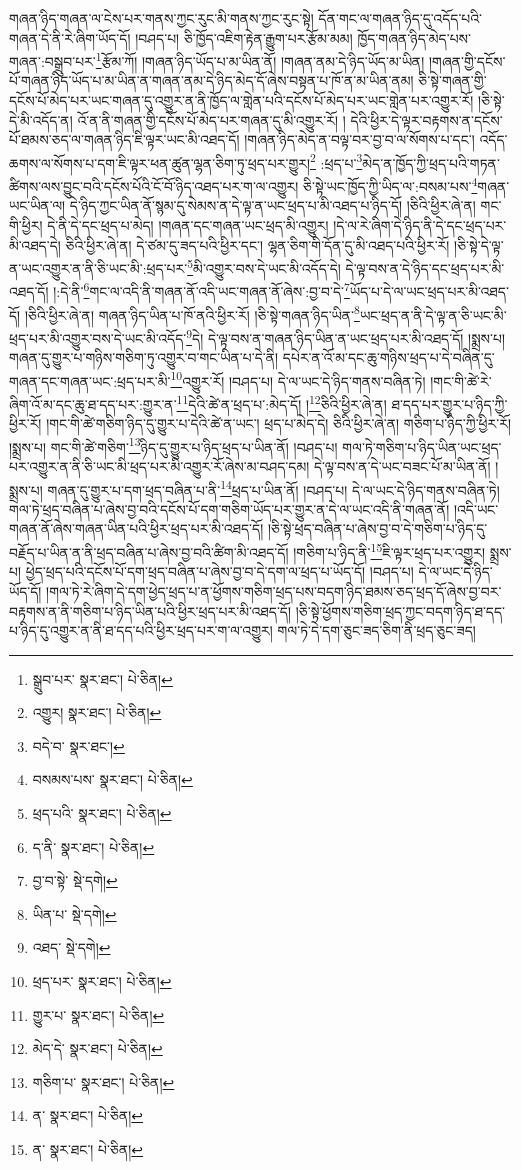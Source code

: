 གཞན་ཉིད་གཞན་ལ་ངེས་པར་གནས་ཀྱང་རུང་མི་གནས་ཀྱང་རུང་སྟེ། དོན་གང་ལ་གཞན་ཉིད་དུ་འདོད་པའི་གཞན་དེ་ནི་རེ་ཞིག་ཡོད་དོ། །བཤད་པ། ཅི་ཁྱོད་འཇིག་རྟེན་རྒྱུག་པར་རྩོམ་མམ། ཁྱོད་གཞན་ཉིད་མེད་པས་གཞན་:བསྒྲུབ་པར་\footnote{སྒྲུབ་པར་  སྣར་ཐང་།  པེ་ཅིན། }རྩོམ་ཀོ། །གཞན་ཉིད་ཡོད་པ་མ་ཡིན་ནོ། །གཞན་ནམ་དེ་ཉིད་ཡོད་མ་ཡིན། །གཞན་གྱི་དངོས་པོ་གཞན་ཉིད་ཡོད་པ་མ་ཡིན་ན་གཞན་ནམ་དེ་ཉིད་མེད་དོ་ཞེས་བསྟན་པ་ཁོ་ན་མ་ཡིན་ནམ། ཅི་སྟེ་གཞན་གྱི་དངོས་པོ་མེད་པར་ཡང་གཞན་དུ་འགྱུར་ན་ནི་ཁྱོད་ལ་གླེན་པའི་དངོས་པོ་མེད་པར་ཡང་གླེན་པར་འགྱུར་རོ། །ཅི་སྟེ་དེ་མི་འདོད་ན། འོ་ན་ནི་གཞན་གྱི་དངོས་པོ་མེད་པར་གཞན་དུ་མི་འགྱུར་རོ། །
དེའི་ཕྱིར་དེ་ལྟར་བརྟགས་ན་དངོས་པོ་ཐམས་ཅད་ལ་གཞན་ཉིད་ཇི་ལྟར་ཡང་མི་འཐད་དོ། །གཞན་ཉིད་མེད་ན་བལྟ་བར་བྱ་བ་ལ་སོགས་པ་དང་། འདོད་ཆགས་ལ་སོགས་པ་དག་ཇི་ལྟར་ཕན་ཚུན་ལྷན་ཅིག་ཏུ་ཕྲད་པར་གྱུར།\footnote{འགྱུར།  སྣར་ཐང་།  པེ་ཅིན། } :ཕྲད་པ་\footnote{བདེ་བ་  སྣར་ཐང་། }མེད་ན་ཁྱོད་ཀྱི་ཕྲད་པའི་གཏན་ཚིགས་ལས་བྱུང་བའི་དངོས་པོའི་ངོ་བོ་ཉིད་འཐད་པར་ག་ལ་འགྱུར། ཅི་སྟེ་ཡང་ཁྱོད་ཀྱི་ཡིད་ལ་:བསམ་པས་\footnote{བསམས་པས་  སྣར་ཐང་།  པེ་ཅིན། }གཞན་ཡང་ཡིན་ལ། དེ་ཉིད་ཀྱང་ཡིན་ནོ་སྙམ་དུ་སེམས་ན་དེ་ལྟ་ན་ཡང་ཕྲད་པ་མི་འཐད་པ་ཉིད་དོ། །ཅིའི་ཕྱིར་ཞེ་ན། གང་གི་ཕྱིར། དེ་ནི་དེ་དང་ཕྲད་པ་མེད། །གཞན་དང་གཞན་ཡང་ཕྲད་མི་འགྱུར། །དེ་ལ་རེ་ཞིག་དེ་ཉིད་ནི་དེ་དང་ཕྲད་པར་མི་འཐད་དེ། ཅིའི་ཕྱིར་ཞེ་ན། དེ་ཙམ་དུ་ཟད་པའི་ཕྱིར་དང་། ལྷན་ཅིག་གི་དོན་དུ་མི་འཐད་པའི་ཕྱིར་རོ། །ཅི་སྟེ་དེ་ལྟ་ན་ཡང་འགྱུར་ན་ནི་ཅི་ཡང་མི་:ཕྲད་པར་\footnote{ཕྲད་པའི་  སྣར་ཐང་།  པེ་ཅིན། }མི་འགྱུར་བས་དེ་ཡང་མི་འདོད་དེ། དེ་ལྟ་བས་ན་དེ་ཉིད་དང་ཕྲད་པར་མི་འཐད་དོ། །:དེ་ནི་\footnote{ད་ནི་  སྣར་ཐང་།  པེ་ཅིན། }གང་ལ་འདི་ནི་གཞན་ནོ་འདི་ཡང་གཞན་ནོ་ཞེས་:བྱ་བ་དེ་\footnote{བྱ་བ་སྟེ་  སྡེ་དགེ། }ཡོད་པ་དེ་ལ་ཡང་ཕྲད་པར་མི་འཐད་དོ། །ཅིའི་ཕྱིར་ཞེ་ན། གཞན་ཉིད་ཡིན་པ་ཁོ་ནའི་ཕྱིར་རོ། །ཅི་སྟེ་གཞན་ཉིད་ཡིན་\footnote{ཡིན་པ་  སྡེ་དགེ། }ཡང་ཕྲད་ན་ནི་དེ་ལྟ་ན་ཅི་ཡང་མི་ཕྲད་པར་མི་འགྱུར་བས་དེ་ཡང་མི་འདོད་\footnote{འཐད་  སྡེ་དགེ། }དེ། དེ་ལྟ་བས་ན་གཞན་ཉིད་ཡིན་ན་ཡང་ཕྲད་པར་མི་འཐད་དོ། །སྨྲས་པ། གཞན་དུ་གྱུར་པ་གཉིས་གཅིག་ཏུ་འགྱུར་བ་གང་ཡིན་པ་དེ་ནི། དཔེར་ན་འོ་མ་དང་ཆུ་གཉིས་ཕྲད་པ་དེ་བཞིན་དུ་གཞན་དང་གཞན་ཡང་:ཕྲད་པར་མི་\footnote{ཕྲད་པར་  སྣར་ཐང་།  པེ་ཅིན། }འགྱུར་རོ། །བཤད་པ། དེ་ལ་ཡང་དེ་ཉིད་གནས་བཞིན་ཏེ། །གང་གི་ཚེ་རེ་ཞིག་འོ་མ་དང་ཆུ་ཐ་དད་པར་:གྱུར་ན་\footnote{གྱུར་པ་  སྣར་ཐང་།  པེ་ཅིན། }དེའི་ཚེ་ན་ཕྲད་པ་:མེད་དོ། །\footnote{མེད་དེ་  སྣར་ཐང་།  པེ་ཅིན། }ཅིའི་ཕྱིར་ཞེ་ན། ཐ་དད་པར་གྱུར་པ་ཉིད་ཀྱི་ཕྱིར་རོ། །གང་གི་ཚེ་གཅིག་ཉིད་དུ་གྱུར་པ་དེའི་ཚེ་ན་ཡང་། ཕྲད་པ་མེད་དེ། ཅིའི་ཕྱིར་ཞེ་ན། གཅིག་པ་ཉིད་ཀྱི་ཕྱིར་རོ། །སྨྲས་པ། གང་གི་ཚེ་གཅིག་\footnote{གཅིག་པ་  སྣར་ཐང་།  པེ་ཅིན། }ཉིད་དུ་གྱུར་པ་ཉིད་ཕྲད་པ་ཡིན་ནོ། །བཤད་པ། གལ་ཏེ་གཅིག་པ་ཉིད་ཡིན་ཡང་ཕྲད་པར་འགྱུར་ན་ནི་ཅི་ཡང་མི་ཕྲད་པར་མི་འགྱུར་རོ་ཞེས་མ་བཤད་དམ། དེ་ལྟ་བས་ན་དེ་ཡང་བཟང་པོ་མ་ཡིན་ནོ། །སྨྲས་པ། གཞན་དུ་གྱུར་པ་དག་ཕྲད་བཞིན་པ་ནི་\footnote{ན་  སྣར་ཐང་།  པེ་ཅིན། }ཕྲད་པ་ཡིན་ནོ། །བཤད་པ། དེ་ལ་ཡང་དེ་ཉིད་གནས་བཞིན་ཏེ། གལ་ཏེ་ཕྲད་བཞིན་པ་ཞེས་བྱ་བའི་དངོས་པོ་དག་གཅིག་ཡོད་པར་གྱུར་ན་དེ་ལ་ཡང་འདི་ནི་གཞན་ནོ། །འདི་ཡང་གཞན་ནོ་ཞེས་གཞན་ཡིན་པའི་ཕྱིར་ཕྲད་པར་མི་འཐད་དོ། །ཅི་སྟེ་ཕྲད་བཞིན་པ་ཞེས་བྱ་བ་དེ་གཅིག་པ་ཉིད་དུ་བརྗོད་པ་ཡིན་ན་ནི་ཕྲད་བཞིན་པ་ཞེས་བྱ་བའི་ཚིག་མི་འཐད་དོ། །གཅིག་པ་ཉིད་ནི་\footnote{ན་  སྣར་ཐང་།  པེ་ཅིན། }ཇི་ལྟར་ཕྲད་པར་འགྱུར། སྨྲས་པ། ཕྱེད་ཕྲད་པའི་དངོས་པོ་དག་ཕྲད་བཞིན་པ་ཞེས་བྱ་བ་དེ་དག་ལ་ཕྲད་པ་ཡོད་དོ། །བཤད་པ། དེ་ལ་ཡང་དེ་ཉིད་ཡོད་དོ། །གལ་ཏེ་རེ་ཞིག་དེ་དག་ཕྱེད་ཕྲད་པ་ན་ཕྱོགས་གཅིག་ཕྲད་པས་བདག་ཉིད་ཐམས་ཅད་ཕྲད་དོ་ཞེས་བྱ་བར་བརྟགས་ན་ནི་གཅིག་པ་ཉིད་ཡིན་པའི་ཕྱིར་ཕྲད་པར་མི་འཐད་དོ། །ཅི་སྟེ་ཕྱོགས་གཅིག་ཕྲད་ཀྱང་བདག་ཉིད་ཐ་དད་པ་ཉིད་དུ་འགྱུར་ན་ནི་ཐ་དད་པའི་ཕྱིར་ཕྲད་པར་ག་ལ་འགྱུར། གལ་ཏེ་དེ་དག་ཅུང་ཟད་ཅིག་ནི་ཕྲད་ཅུང་ཟད། 